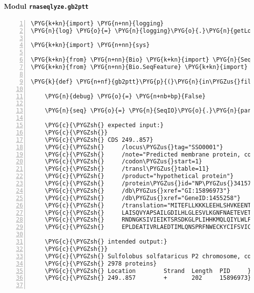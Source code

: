 \paragraph{Modul \texttt{rnaseqlyze.gb2ptt}}
\label{rnaseqlyze-pdf:modul-rnaseqlyze-gb2ptt}
\begin{Verbatim}[commandchars=\\\{\},numbers=left,firstnumber=1,stepnumber=5]
\PYG{k+kn}{import} \PYG{n+nn}{logging}
\PYG{n}{log} \PYG{o}{=} \PYG{n}{logging}\PYG{o}{.}\PYG{n}{getLogger}\PYG{p}{(}\PYG{n}{\PYGZus{}\PYGZus{}name\PYGZus{}\PYGZus{}}\PYG{p}{)}

\PYG{k+kn}{import} \PYG{n+nn}{sys}

\PYG{k+kn}{from} \PYG{n+nn}{Bio} \PYG{k+kn}{import} \PYG{n}{SeqIO}
\PYG{k+kn}{from} \PYG{n+nn}{Bio.SeqFeature} \PYG{k+kn}{import} \PYG{n}{ExactPosition}

\PYG{k}{def} \PYG{n+nf}{gb2ptt}\PYG{p}{(}\PYG{n}{in\PYGZus{}file}\PYG{p}{,} \PYG{n}{out\PYGZus{}file}\PYG{p}{)}\PYG{p}{:}

    \PYG{n}{debug} \PYG{o}{=} \PYG{n+nb+bp}{False}

    \PYG{n}{seq} \PYG{o}{=} \PYG{n}{SeqIO}\PYG{o}{.}\PYG{n}{parse}\PYG{p}{(}\PYG{n}{in\PYGZus{}file}\PYG{p}{,} \PYG{l+s}{"}\PYG{l+s}{genbank}\PYG{l+s}{"}\PYG{p}{)}\PYG{o}{.}\PYG{n}{next}\PYG{p}{(}\PYG{p}{)}

    \PYG{c}{\PYGZsh{} expected input:}
    \PYG{c}{\PYGZsh{}}
    \PYG{c}{\PYGZsh{} CDS 249..857}
    \PYG{c}{\PYGZsh{}     /locus\PYGZus{}tag="SSO0001"}
    \PYG{c}{\PYGZsh{}     /note="Predicted membrane protein, conserved in archaea"}
    \PYG{c}{\PYGZsh{}     /codon\PYGZus{}start=1}
    \PYG{c}{\PYGZsh{}     /transl\PYGZus{}table=11}
    \PYG{c}{\PYGZsh{}     /product="hypothetical protein"}
    \PYG{c}{\PYGZsh{}     /protein\PYGZus{}id="NP\PYGZus{}341578.1"}
    \PYG{c}{\PYGZsh{}     /db\PYGZus{}xref="GI:15896973"}
    \PYG{c}{\PYGZsh{}     /db\PYGZus{}xref="GeneID:1455258"}
    \PYG{c}{\PYGZsh{}     /translation="MITEFLLKKKLEEHLSHVKEENTIYVTDLVRCPRRVRYESEYKE}
    \PYG{c}{\PYGZsh{}     LAISQVYAPSAILGDILHLGLESVLKGNFNAETEVETLREINVGGKVYKIKGRADAII}
    \PYG{c}{\PYGZsh{}     RNDNGKSIVIEIKTSRSDKGLPLIHHKMQLQIYLWLFSAEKGILVYITPDRIAEYEIN}
    \PYG{c}{\PYGZsh{}     EPLDEATIVRLAEDTIMLQNSPRFNWECKYCIFSVICPAKLT"}

    \PYG{c}{\PYGZsh{} intended output:}
    \PYG{c}{\PYGZsh{}}
    \PYG{c}{\PYGZsh{} Sulfolobus solfataricus P2 chromosome, complete genome - 1..2992245}
    \PYG{c}{\PYGZsh{} 2978 proteins}
    \PYG{c}{\PYGZsh{} Location        Strand  Length  PID     }
    \PYG{c}{\PYGZsh{} 249..857        +       202     15896973}


\end{Verbatim}
